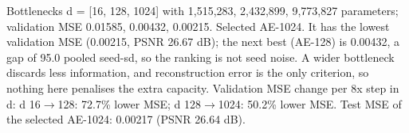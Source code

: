 Bottlenecks d = [16, 128, 1024] with 1,515,283, 2,432,899, 9,773,827 parameters; validation MSE 0.01585, 0.00432, 0.00215. Selected AE-1024. It has the lowest validation MSE (0.00215, PSNR 26.67 dB); the next best (AE-128) is 0.00432, a gap of 95.0 pooled seed-sd, so the ranking is not seed noise. A wider bottleneck discards less information, and reconstruction error is the only criterion, so nothing here penalises the extra capacity. Validation MSE change per 8x step in d: d 16$\rightarrow$128: 72.7\% lower MSE; d 128$\rightarrow$1024: 50.2\% lower MSE. Test MSE of the selected AE-1024: 0.00217 (PSNR 26.64 dB).
